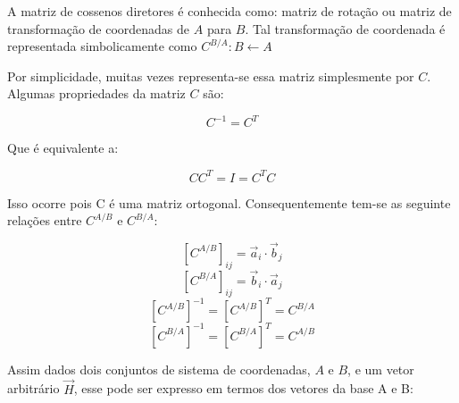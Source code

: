 A matriz de cossenos diretores é conhecida como: matriz de rotação ou matriz de transformação de coordenadas de \begin{math}A\end{math} para \begin{math}B\end{math}. Tal transformação de coordenada é representada simbolicamente como \begin{math}C^{B/A}:B\leftarrow A\end{math}

Por simplicidade, muitas vezes representa-se essa matriz simplesmente por \begin{math}C\end{math}. Algumas propriedades da matriz \begin{math}C\end{math} são:

\begin{equation}C^{-1}=C^T\end{equation}

Que é equivalente a:

\begin{equation}CC^T=I=C^TC\end{equation}

Isso ocorre pois C é uma matriz ortogonal. Consequentemente tem-se as seguinte relações entre \begin{math}C^{A/B}\end{math} e \begin{math}C^{B/A}\end{math}: 

\begin{equation}
\left[C^{A/B}\right]_{ij}=\vec{a}_i\cdot\vec{b}_j
\end{equation}
\begin{equation}
\left[C^{B/A}\right]_{ij}=\vec{b}_i\cdot\vec{a}_j
\end{equation}
\begin{equation}
\left[C^{A/B}\right]^{-1}=\left[C^{A/B}\right]^T=C^{B/A}
\end{equation}
\begin{equation}
\left[C^{B/A}\right]^{-1}=\left[C^{B/A}\right]^T=C^{A/B}
\end{equation}

Assim dados dois conjuntos de sistema de coordenadas, \begin{math}A\end{math} e \begin{math}B\end{math}, e um vetor arbitrário \begin{math}\vec{H}\end{math}, esse pode ser expresso em termos dos vetores da base A e B:

